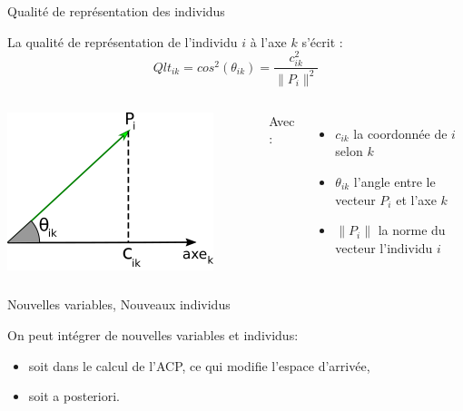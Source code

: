 \documentclass{beamer}
\begin{document}
\begin{frame}{Qualité de représentation des individus}

La \alert{qualité de représentation} de l'individu $i$ à l'axe $k$ s'écrit : 
$$Qlt_{ik}=cos^2(\theta_{ik})= \frac{c_{ik}^2}{\|P_i\| ^2}$$



\begin{columns}[T,onlytextwidth]

\colorbox{white}{\includegraphics[width=0.85\textwidth,keepaspectratio]{img/angle_qualite_repres_axe.png}}


  Avec : 
  \begin{itemize}
  \setlength\itemsep{-0.1em}
  \item $c_{ik}$ la coordonnée de $i$ selon $k$
  \item $\theta_{ik}$ l'angle entre le vecteur $P_i$ et l'axe $k$
  \item $\|P_i\|$ la norme du vecteur  l'individu $i$
\end{itemize}
\end{columns}

\end{frame}


\begin{frame}{Nouvelles variables, Nouveaux individus}


On peut intégrer de nouvelles variables et individus: 
\begin{itemize}
\item soit dans le calcul de l'ACP, ce qui modifie l'espace d'arrivée,
\item soit \alert{a posteriori}.
\end{itemize}



\end{frame}
\end{document}
